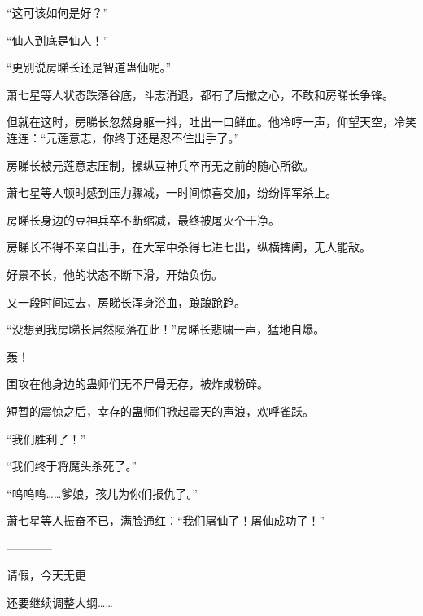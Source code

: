 \begin{this_body}
“这可该如何是好？”

“仙人到底是仙人！”

“更别说房睇长还是智道蛊仙呢。”

萧七星等人状态跌落谷底，斗志消退，都有了后撤之心，不敢和房睇长争锋。

但就在这时，房睇长忽然身躯一抖，吐出一口鲜血。他冷哼一声，仰望天空，冷笑连连：“元莲意志，你终于还是忍不住出手了。”

房睇长被元莲意志压制，操纵豆神兵卒再无之前的随心所欲。

萧七星等人顿时感到压力骤减，一时间惊喜交加，纷纷挥军杀上。

房睇长身边的豆神兵卒不断缩减，最终被屠灭个干净。

房睇长不得不亲自出手，在大军中杀得七进七出，纵横捭阖，无人能敌。

好景不长，他的状态不断下滑，开始负伤。

又一段时间过去，房睇长浑身浴血，踉踉跄跄。

“没想到我房睇长居然陨落在此！”房睇长悲啸一声，猛地自爆。

轰！

围攻在他身边的蛊师们无不尸骨无存，被炸成粉碎。

短暂的震惊之后，幸存的蛊师们掀起震天的声浪，欢呼雀跃。

“我们胜利了！”

“我们终于将魔头杀死了。”

“呜呜呜……爹娘，孩儿为你们报仇了。”

萧七星等人振奋不已，满脸通红：“我们屠仙了！屠仙成功了！”

------------

请假，今天无更

还要继续调整大纲……

\end{this_body}

